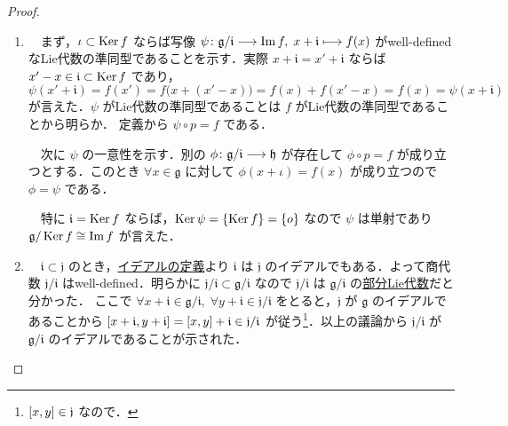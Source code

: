 \documentclass[rep_main]{subfiles}
\begin{document}
\begin{proof}
    \begin{enumerate}
        \item 
        　まず，$\iota \subset \operatorname{Ker} f$ ならば写像 $\psi \colon \mathfrak{g} / \mathfrak{i} \longrightarrow \Im f,\; x + \mathfrak{i} \longmapsto f(x)$ がwell-definedなLie代数の準同型であることを示す．実際 $x + \mathfrak{i} = x' + \mathfrak{i}$ ならば $x' - x \in \mathfrak{i} \subset \operatorname{Ker} f$ であり， 
        $\psi (x' + \mathfrak{i}) = f(x') = f\bigl(x + (x' - x)\bigr) = f(x) + f(x'-x) = f(x) = \psi (x + \mathfrak{i})$ が言えた．$\psi$ がLie代数の準同型であることは $f$ がLie代数の準同型であることから明らか．
        定義から $\psi \circ p = f$ である．

        　次に $\psi$ の一意性を示す．別の $\phi \colon \mathfrak{g} / \mathfrak{i} \longrightarrow \mathfrak{h}$ が存在して $\phi \circ p = f$ が成り立つとする．このとき $\forall x \in \mathfrak{g}$ に対して $\phi (x + \iota) = f(x)$ が成り立つので $\phi = \psi$ である．

        　特に $\mathfrak{i} = \operatorname{Ker} f$ ならば，$\operatorname{Ker} \psi = \{\operatorname{Ker} f\} = \{ o \}$ なので $\psi$ は単射であり $\mathfrak{g} / \operatorname{Ker} f \cong \Im f$ が言えた．
        \item 
        　$\mathfrak{i} \subset \mathfrak{j}$ のとき，\hyperref[def:ideal-LieAlg]{イデアルの定義}より $\mathfrak{i}$ は $\mathfrak{j}$ のイデアルでもある．よって商代数 $\mathfrak{j}/\mathfrak{i}$ はwell-defined．明らかに $\mathfrak{j} / \mathfrak{i} \subset \mathfrak{g} / \mathfrak{i}$ なので $\mathfrak{j} / \mathfrak{i}$ は $\mathfrak{g} / \mathfrak{i}$ の\hyperref[def:subLieAlg]{部分Lie代数}だと分かった．
        ここで $\forall x + \mathfrak{i} \in \mathfrak{g}/\mathfrak{i},\; \forall y + \mathfrak{i} \in \mathfrak{j}/ \mathfrak{i}$ をとると，$\mathfrak{j}$ が $\mathfrak{g}$ のイデアルであることから $\comm{x + \mathfrak{i}}{y + \mathfrak{i}} = \comm{x}{y} + \mathfrak{i} \in \mathfrak{j} / \mathfrak{i}$ が従う\footnote{$\comm{x}{y} \in \mathfrak{j}$ なので．}．以上の議論から $\mathfrak{j}/\mathfrak{i}$ が $\mathfrak{g} / \mathfrak{i}$ のイデアルであることが示された．


\end{enumerate}
\end{proof}
\end{document}
